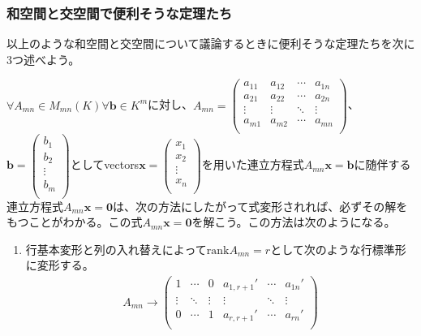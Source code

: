 \documentclass[dvipdfmx]{jsarticle}
\begin{document}
\subsubsection{和空間と交空間で便利そうな定理たち}%
以上のような和空間と交空間について議論するときに便利そうな定理たちを次に3つ述べよう。
\begin{thm*}
  $\forall A_{mn} \in M_{mn}(K)\forall\mathbf{b} \in K^{m}$に対し、$A_{mn} = \begin{pmatrix}
    a_{11} & a_{12} & \cdots & a_{1n} \\
    a_{21} & a_{22} & \cdots & a_{2n} \\
     \vdots & \vdots & \ddots & \vdots \\
    a_{m1} & a_{m2} & \cdots & a_{mn} \\
    \end{pmatrix}$、$\mathbf{b} = \begin{pmatrix}
    b_{1} \\
    b_{2} \\
     \vdots \\
    b_{m} \\
    \end{pmatrix}$としてvectors$\mathbf{x} = \begin{pmatrix}
    x_{1} \\
    x_{2} \\
     \vdots \\
    x_{n} \\
    \end{pmatrix}$を用いた連立方程式$A_{mn}\mathbf{x} = \mathbf{b}$に随伴する連立方程式$A_{mn}\mathbf{x} = \mathbf{0}$は、次の方法にしたがって式変形されれば、必ずその解をもつことがわかる。この式$A_{mn}\mathbf{x} = \mathbf{0}$を解こう。この方法は次のようになる。
    \begin{enumerate}
    \item
      行基本変形と列の入れ替えによって${\mathrm{rank}}A_{mn} = r$として次のような行標準形に変形する。
    \begin{align*}
    A_{mn} \rightarrow \begin{pmatrix}
    1 & \cdots & 0 & a_{1,r + 1}' & \cdots & a_{1n}' \\
     \vdots & \ddots & \vdots & \vdots & \ddots & \vdots \\
    0 & \cdots & 1 & a_{r,r + 1}' & \cdots & a_{rn}' \\

\end{pmatrix}
\end{align*}
\end{enumerate}
\end{thm*}
\end{document}
